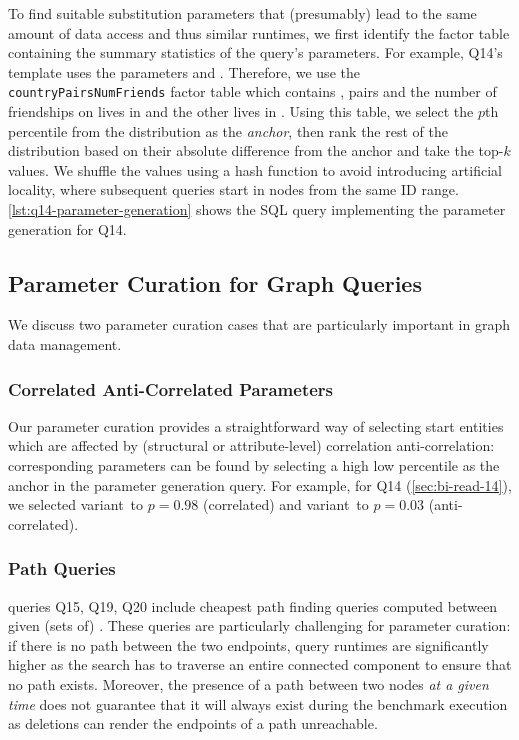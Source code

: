 To find suitable substitution parameters that (presumably) lead to the same amount of data access and thus similar runtimes,
we first identify the factor table containing the summary statistics of the query's parameters.
For example, Q14's template uses the parameters \tCountry {} and \tCountry {}.
Therefore, we use the \texttt{countryPairsNumFriends} factor table which contains ,  pairs and the number of friendships on \tPerson lives in  and the other lives in .
Using this table, we select the $p$th percentile from the distribution as the \emph{anchor},
then rank the rest of the distribution based on their absolute difference from the anchor and take the top-$k$ values.
We shuffle the values using a hash function to avoid introducing artificial locality, where \eg subsequent queries start in nodes from the same ID range.
\autoref{lst:q14-parameter-generation} shows the SQL query implementing the parameter generation for Q14\variantA.

\subsection{Parameter Curation for Graph Queries}

We discuss two parameter curation cases that are particularly important in graph data management.

\subsubsection{Correlated \vs Anti-Correlated Parameters}
\label{sec:paramgen-correlations}

Our parameter curation provides a straightforward way of selecting start entities which
are affected by (structural or attribute-level) correlation \vs anti-correlation:
corresponding parameters can be found by selecting a high \vs low percentile as the anchor
in the parameter generation query.
For example, for Q14 (\autoref{sec:bi-read-14}),
we selected
variant~\variantA to $p=0.98$ (correlated) and
variant~\variantB to $p=0.03$ (anti-correlated).

\subsubsection{Path Queries}
\label{sec:path-queries}

\snbbi queries Q15, Q19, Q20 include cheapest path finding queries computed between given (sets of) \tPersons.
These queries are particularly challenging for parameter curation:
if there is no path between the two endpoints, query runtimes are significantly higher as the search has to traverse an entire connected component to ensure that no path exists.
Moreover, the presence of a path between two nodes \emph{at a given time} does not guarantee that it will always exist during the benchmark execution as deletions can render the endpoints of a path unreachable.

